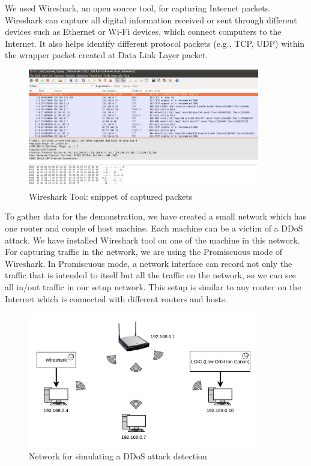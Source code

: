 \documentclass[12pt,oneside,a4paper]{article}
\begin{document}
We used Wireshark, an open source tool, for capturing Internet packets. Wireshark can capture all digital information received or sent through different devices such as Ethernet or Wi-Fi devices, which connect computers to the Internet. It also helps identify different protocol packets (e.g., TCP, UDP) within the wrapper packet created at Data Link Layer packet.\par

\begin{figure}[H]
\centering
\includegraphics[width=0.90\textwidth]{Wireshark_Tools.png}
\caption{Wireshark Tool: snippet of captured packets} \label{fig:wireshark}
\end{figure}

To gather data for the demonstration, we have created a small network which has one router and couple of host machine. Each machine can be a victim of a DDoS attack. We have installed Wireshark tool on one of the machine in  this network. For capturing traffic in the network, we are using the Promiscuous mode of Wireshark. In Promiscuous mode, a network interface can record not only the traffic that is intended to itself but all the traffic on the network, so we can see all in/out traffic in our setup network. This setup is similar to any router on the Internet which is connected with different routers and hosts.

\begin{figure}[H]
\centering
\includegraphics[width=0.90\textwidth]{demo_network.png}
\caption{Network for simulating a DDoS attack detection} \label{fig:demonetwork}
\end{figure}
\end{document}
